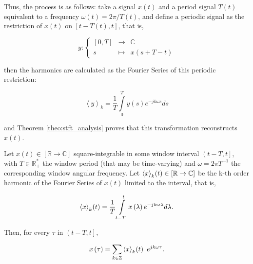 	Thus, the process is as follows: take a signal $x(t)$ and a period signal $T(t)$ equivalent to a frequency $\omega(t) = 2\pi/T(t)$, and define a periodic signal as the restriction of $x(t)$ on $\left[t-T(t),t\right]$, that is,

\begin{equation} y: \left\{\begin{array}{rcl} \left[0,T\right] &\to& \mathbb{C} \\[3mm] s &\mapsto& x\left(s + T - t\right) \end{array}\right. \end{equation}

	\noindent then the harmonics are calculated as the Fourier Series of this periodic restriction:

\begin{equation} \left\langle y \right\rangle_k = \dfrac{1}{T}\int\limits_{0}^{T}y\left(s\right) e^{-jk\omega s}ds  \end{equation}

	\noindent and Theorem \ref{theo:stft_analysis} proves that this transformation reconstructs $x(t)$.

\begin{theorem} \label{theo:stft_analysis}%
	Let $x(t)\in\left[\mathbb{R}\to\mathbb{C}\right]$ square-integrable in some window interval $\left(t-T,t\right]$, with $T\in\mathbb{R}_+^*$ the window period (that may be time-varying) and $\omega = 2\pi T^{-1}$ the corresponding window angular frequency. Let $\left\langle x \right\rangle_k\hspace{-0.5mm} \left(t\right)\in\left[\mathbb{R}\to\mathbb{C}\right]$ be the k-th order harmonic of the Fourier Series of $x(t)$ limited to the interval, that is,

\begin{equation} \left\langle x \right\rangle_k\hspace{-0.5mm} \left(t\right) = \dfrac{1}{T}\int\limits_{t-T}^{t}x\left(\lambda\right) e^{-jk\omega\lambda}d\lambda .\label{eq:harmonics} \end{equation}

	Then, for every $\tau$ in $\left(t-T,t\right]$,

\begin{equation} x\left(\tau\right) = \sum\limits_{k\in\mathbb{Z}} \left\langle x \right\rangle_k\hspace{-0.5mm} \left(t\right)\ e^{jk\omega\tau}. \label{eq:fourierSeries} \end{equation}

\end{theorem}

